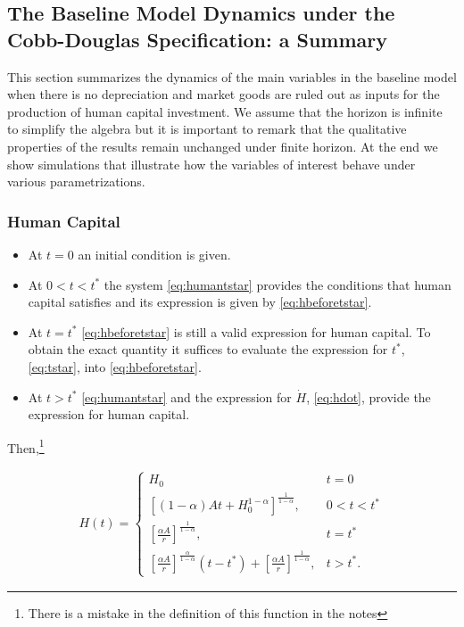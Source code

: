 \subsection{The Baseline Model Dynamics under the Cobb-Douglas Specification: a Summary}
This section summarizes the dynamics of the main variables in the baseline model when there is no depreciation and market goods are ruled out as inputs for the production of human capital investment. We assume that the horizon is infinite to simplify the algebra but it is important to remark that the qualitative properties of the results remain unchanged under finite horizon. At the end we show simulations that illustrate how the variables of interest behave under various parametrizations. 

\subsubsection{Human Capital}
\begin{itemize}
\item At $t = 0$ an initial condition is given.
\item At $0 < t < t^*$ the system \eqref{eq:humantstar} provides the conditions that human capital satisfies and its expression is given by \eqref{eq:hbeforetstar}.
\item At $t = t^*$ \eqref{eq:hbeforetstar} is still a valid expression for human capital. To obtain the exact quantity it suffices to evaluate the expression for $t^*$, \eqref{eq:tstar}, into \eqref{eq:hbeforetstar}.
\item At $ t > t^* $ \eqref{eq:humantstar} and the expression for $\dot{H}$, \eqref{eq:hdot}, provide the expression for human capital.
\end{itemize}

Then,\footnote{There is a mistake in the definition of this function in the notes}

\begin{eqnarray}
H(t) =
\begin{cases}
H_{0} & t = 0 \\
\left[ (1 - \alpha)At + H_{0}^{1-\alpha} \right]^{\frac{1}{1-\alpha}} , & 0 < t < t^* \\
\left[ \frac{\alpha A}{r} \right]^{\frac{1}{1 - \alpha}}, & t = t^* \\
\left[ \frac{\alpha A}{r} \right]^{\frac{ \alpha }{1 - \alpha}} \left( t - t^* \right) + \left[ \frac{\alpha A}{r} \right]^{\frac{1}{1 - \alpha}} , & t > t^*. \label{eq:humancapall}
\end{cases}
\end{eqnarray}

